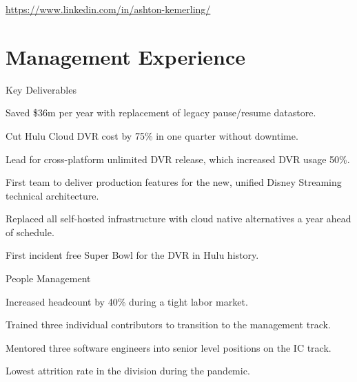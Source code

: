 \documentclass[]{deedy-resume-openfont}
\begin{document}
%
%
\lastupdated

%
%



\href{https://www.linkedin.com/in/ashton-kemerling/}{https://www.linkedin.com/in/ashton-kemerling/}

\begin{center}
\end{center}

\section{Management Experience}

\vspace{\topsep}
Key Deliverables
\begin{tightemize}
\item Saved \$36m per year with replacement of legacy pause/resume datastore.
\item Cut Hulu Cloud DVR cost by 75\% in one quarter without downtime.
\item Lead for cross-platform unlimited DVR release, which increased DVR usage 50\%.
\item First team to deliver production features for the new, unified Disney Streaming technical architecture.
\item Replaced all self-hosted infrastructure with cloud native alternatives a year ahead of schedule.
\item First incident free Super Bowl for the DVR in Hulu history.
\end{tightemize}

\sectionsep
People Management
\begin{tightemize}
\item Increased headcount by 40\% during a tight labor market.
\item Trained three individual contributors to transition to the management track.
\item Mentored three software engineers into senior level positions on the IC track.
\item Lowest attrition rate in the division during the pandemic.
\end{tightemize}
\sectionsep
\end{document}
